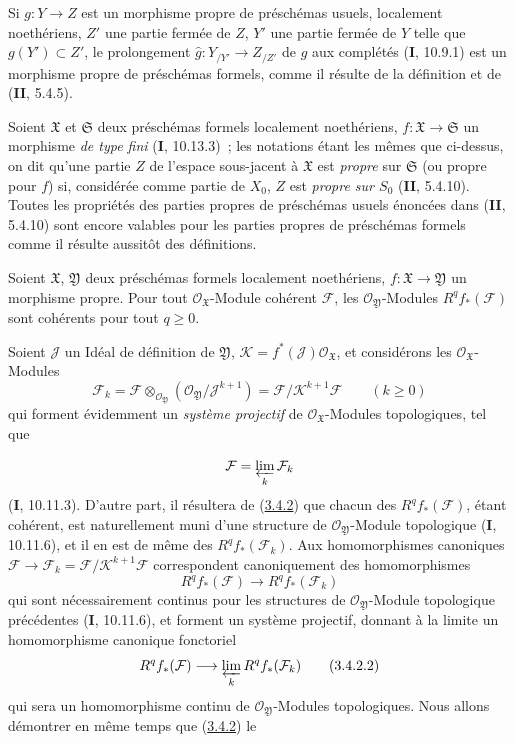 \begin{env}[3.4.1]
Si $g:Y\to Z$ est un morphisme propre de préschémas usuels, localement
noethériens, $Z'$ une partie fermée de $Z$, $Y'$ une partie fermée de $Y$
telle que $g(Y')\subset Z'$, le prolongement
$\widehat g:Y_{/Y'}\to Z_{/Z'}$ de $g$ aux complétés (\textbf{I}, 10.9.1) est un
morphisme propre de préschémas formels, comme il résulte de la définition et
de (\textbf{II}, 5.4.5).

Soient $\mathfrak X$ et $\mathfrak S$ deux préschémas formels localement
noethériens, $f:\mathfrak X\to\mathfrak S$ un morphisme \emph{de type fini}
(\textbf{I}, 10.13.3)~; les notations étant les mêmes que ci-dessus, on dit qu'une
partie $Z$ de l'espace sous-jacent à $\mathfrak X$ est \emph{propre} sur
$\mathfrak S$ (ou propre pour $f$) si, considérée comme partie de $X_0$, $Z$
est \emph{propre sur $S_0$} (\textbf{II}, 5.4.10). Toutes les propriétés des parties
propres de préschémas usuels énoncées dans (\textbf{II}, 5.4.10) sont encore valables
pour les parties propres de préschémas formels comme il résulte aussitôt des
définitions.
\end{env}

\begin{theorem}[3.4.2]
\label{III.3.4.2-fr}
Soient $\mathfrak X$, $\mathfrak Y$ deux préschémas formels localement
noethériens, $f:\mathfrak X\to\mathfrak Y$ un morphisme propre. Pour tout
$\mathcal O_{\mathfrak X}$-Module cohérent $\mathcal F$, les
$\mathcal O_{\mathfrak Y}$-Modules $R^qf_*(\mathcal F)$ sont cohérents pour
tout $q\geq0$.
\end{theorem}

Soient $\mathcal J$ un Idéal de définition de $\mathfrak Y$,
$\mathcal K=f^*(\mathcal J)\mathcal O_{\mathfrak X}$, et considérons les
$\mathcal O_{\mathfrak X}$-Modules
\[
\mathcal F_k=\mathcal F\otimes_{\mathcal O_{\mathfrak Y}}
(\mathcal O_{\mathfrak Y}/\mathcal J^{k+1})
=\mathcal F/\mathcal K^{k+1}\mathcal F\qquad(k\geq0)
\tag{3.4.2.1}\label{III.3.4.2.1-fr}
\]
qui forment évidemment un \emph{système projectif} de
$\mathcal O_{\mathfrak X}$-Modules topologiques, tel que

\[
\mathcal F=\varprojlim_k\mathcal F_k
\]
(\textbf{I}, 10.11.3). D'autre part, il résultera de
(\hyperref[III.3.4.2-fr]{3.4.2}) que chacun des $R^qf_*(\mathcal F)$, étant
cohérent, est naturellement muni d'une structure de
$\mathcal O_{\mathfrak Y}$-Module topologique (\textbf{I}, 10.11.6), et il en est de
même des $R^qf_*(\mathcal F_k)$. Aux homomorphismes canoniques
$\mathcal F\to\mathcal F_k=\mathcal F/\mathcal K^{k+1}\mathcal F$
correspondent canoniquement des homomorphismes
\[
R^qf_*(\mathcal F)\longrightarrow R^qf_*(\mathcal F_k)
\]
qui sont nécessairement continus pour les structures de
$\mathcal O_{\mathfrak Y}$-Module topologique précédentes (\textbf{I}, 10.11.6), et
forment un système projectif, donnant à la limite un homomorphisme canonique
fonctoriel
\[
R^qf_*(\mathcal F)\longrightarrow\varprojlim_kR^qf_*(\mathcal F_k)
\tag{3.4.2.2}\label{III.3.4.2.2-fr}
\]
qui sera un homomorphisme continu de $\mathcal O_{\mathfrak Y}$-Modules
topologiques. Nous allons démontrer en même temps que
(\hyperref[III.3.4.2-fr]{3.4.2}) le

